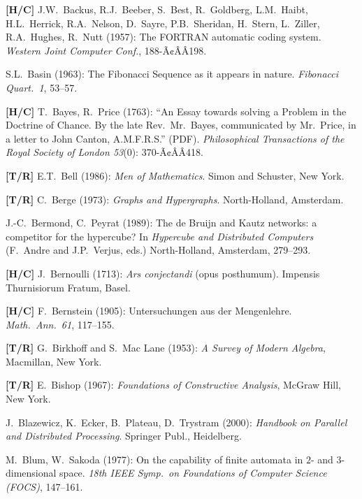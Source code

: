 \begin{thebibliography}{999}
{\bf [H/C]}
J.W.~Backus, R.J.~Beeber, S.~Best, R.~Goldberg, L.M.~Haibt, H.L.~Herrick, R.A.~Nelson, D.~Sayre, P.B.~Sheridan, H.~Stern, L.~Ziller, R.A.~Hughes, R.~Nutt (1957):
The FORTRAN automatic coding system.  {\it Western Joint Computer
Conf.}, 188-Ã¢ÂÂ198.


S.L.~Basin (1963): The Fibonacci Sequence as it appears in nature.
{\it Fibonacci Quart.~1}, 53--57.

{\bf [H/C]}
T.~Bayes, R.~Price (1763): ``An Essay towards solving a Problem in the Doctrine of Chance.  By the late Rev.~Mr.~Bayes, communicated by Mr.~Price, in a letter to John Canton, A.M.F.R.S.'' (PDF).  {\it Philosophical Transactions of the Royal
Society of London 53}(0): 370-Ã¢ÂÂ418.

{\bf [T/R]}
E.T.~Bell (1986):
{\it Men of Mathematics}.
Simon and Schuster, New York.

{\bf [T/R]}
C.~Berge (1973):
{\it Graphs and Hypergraphs}.
North-Holland, Amsterdam.

J.-C.~Bermond, C.~Peyrat (1989):
The de Bruijn and Kautz networks: a competitor for the hypercube?  In {\it Hypercube and Distributed Computers} (F.~Andre and J.P.~Verjus, eds.)  North-Holland, Amsterdam, 279--293.

{\bf [H/C]}
J.~Bernoulli (1713):
{\it Ars conjectandi} (opus posthumum).
Impensis Thurnisiorum Fratum, Basel. 

{\bf [H/C]}
F.~Bernstein (1905): Untersuchungen aus der Mengenlehre.  {\it Math.~Ann.~61}, 117--155.

{\bf [T/R]}
G.~Birkhoff and S.~Mac Lane (1953): {\it A Survey of Modern Algebra}, Macmillan, New York.

{\bf [T/R]}
E.~Bishop (1967): {\it Foundations of Constructive Analysis}, McGraw Hill, New York.

J.~Blazewicz, K.~Ecker, B.~Plateau, D.~Trystram (2000):
{\it Handbook on Parallel and Distributed Processing}.
Springer Publ., Heidelberg.

M.~Blum, W.~Sakoda (1977):
On the capability of finite automata in $2$- and $3$- dimensional space.  {\it 18th IEEE Symp.~on Foundations of Computer Science (FOCS)}, 147--161.


\end{thebibliography}
